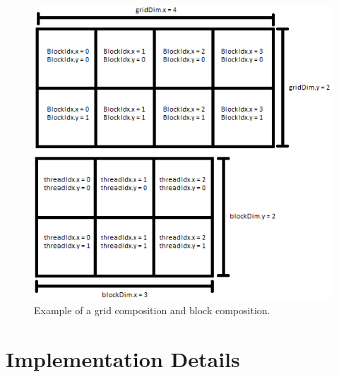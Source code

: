 \documentclass[conference]{IEEEtran}
\begin{document}
\begin{figure}[htbp]
	\centerline{\includegraphics[width=\linewidth]{figures/gridExampleTransparantCropped.png}}
	\caption{Example of a grid composition and block composition.}
	\label{fig1}
\end{figure}

\section{Implementation Details}
\end{document}
